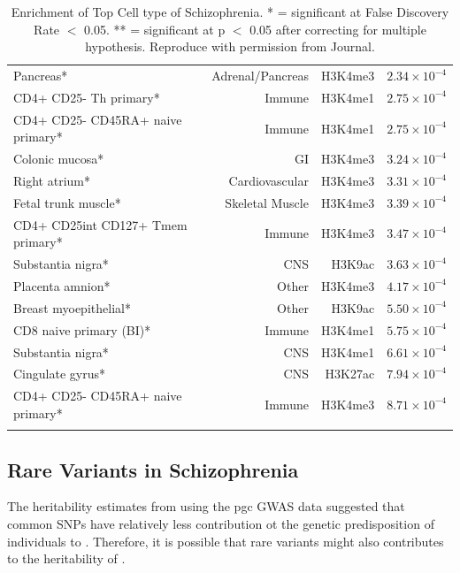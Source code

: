 \begin{singlespace}
\begin{longtable}{p{6cm}rrr}
			Pancreas* & Adrenal/Pancreas & H3K4me3 & $2.34\times 10^{-4}$ \\
			CD4+ CD25- Th primary* & Immune & H3K4me1 & $2.75\times 10^{-4}$ \\
			CD4+ CD25- CD45RA+ naive primary* & Immune & H3K4me1 & $2.75\times 10^{-4}$\\
			Colonic mucosa* & GI    & H3K4me3 & $3.24\times 10^{-4}$ \\
			Right atrium* & Cardiovascular & H3K4me3 & $3.31\times 10^{-4}$ \\
			Fetal trunk muscle* & Skeletal Muscle & H3K4me3 & $3.39\times 10^{-4}$ \\
			CD4+ CD25int CD127+ Tmem primary* & Immune & H3K4me3 & $3.47\times 10^{-4}$ \\
			Substantia nigra* & CNS   & H3K9ac & $3.63\times 10^{-4}$ \\
			Placenta amnion* & Other & H3K4me3 & $4.17\times 10^{-4}$ \\
			Breast myoepithelial* & Other & H3K9ac & $5.50\times 10^{-4}$ \\
			CD8 naive primary (BI)* & Immune & H3K4me1 & $5.75\times 10^{-4}$ \\
			Substantia nigra* & CNS   & H3K4me1 & $6.61\times 10^{-4}$ \\
			Cingulate gyrus* & CNS   & H3K27ac & $7.94\times 10^{-4}$ \\
			CD4+ CD25- CD45RA+ naive primary* & Immune & H3K4me3 & $8.71\times 10^{-4}$ \\
			\bottomrule
			\caption[Enrichment of Top Cell Type of Schizophrenia]{Enrichment of Top Cell type of Schizophrenia.
				* = significant at False Discovery Rate $<$ 0.05.
				** = significant at p $<$ 0.05 after correcting for multiple hypothesis. 
				Reproduce with permission from Journal.\citep{Finucane2015}}
			\label{tab:cellTypeScz}%
		\end{longtable}%
	\end{singlespace}
		
	\subsection{Rare Variants in Schizophrenia}
	The heritability estimates from \citet{Bulik-Sullivan2015} using the \gls{pgc} \gls{GWAS} data suggested that common \glspl{SNP} have relatively less contribution ot the genetic predisposition of individuals to .
	Therefore, it is possible that rare variants might also contributes to the heritability of .
	
